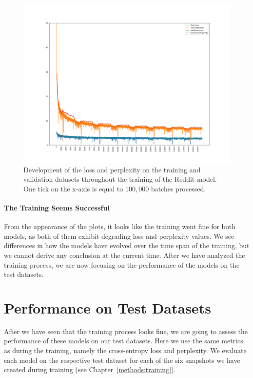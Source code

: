 \begin{figure}[H]
	\includegraphics[width=\linewidth]{img/plots/reddit/train_metrics.png}
	\caption{Development of the loss and perplexity on the training and validation datasets throughout the training of the Reddit model. One tick on the x-axis is equal to $100,000$ batches processed.}
	\label{results:learning_process:metrics:reddit}
\end{figure} 

\paragraph{The Training Seems Successful} From the appearance of the plots, it looks like the training went fine for both models, as both of them exhibit degrading loss and perplexity values. We see differences in how the models have evolved over the time span of the training, but we cannot derive any conclusion at the current time. After we have analyzed the training process, we are now focusing on the performance of the models on the test datasets.

\section{Performance on Test Datasets}
\label{results:performance_on_test_datasets}
After we have seen that the training process looks fine, we are going to assess the performance of these models on our test datasets. Here we use the same metrics as during the training, namely the cross-entropy loss and perplexity. We evaluate each model on the respective test dataset for each of the six snapshots we have created during training (see Chapter~\ref{methods:training}).

